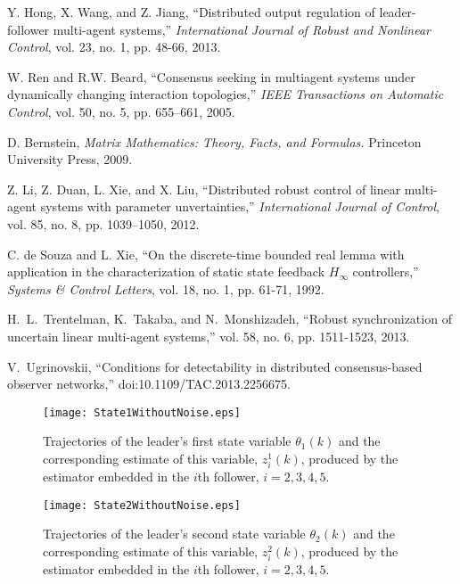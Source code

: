 \documentclass[a4paper,10pt,onecolumn]{article}
\begin{document}
\begin{thebibliography}{99}
Y. Hong, X. Wang, and Z. Jiang, ``Distributed output regulation of leader-follower multi-agent systems,''
\emph{International Journal of Robust and Nonlinear Control}, vol. 23, no. 1, pp. 48-66, 2013.

W. Ren and R.W. Beard, ``Consensus seeking in multiagent systems
under dynamically changing interaction topologies,''
\emph{IEEE Transactions on Automatic Control}, vol. 50, no. 5, pp. 655--661, 2005.

D. Bernstein, \emph{Matrix Mathematics: Theory, Facts, and Formulas.} Princeton University Press, 2009.

Z. Li, Z. Duan, L. Xie, and X. Liu, ``Distributed robust control of linear multi-agent systems with parameter unvertainties,'' \emph{International Journal of Control}, vol. 85, no. 8, pp. 1039--1050, 2012.


C. de Souza and L. Xie, ``On the discrete-time bounded real lemma with application in the characterization
of static state feedback $H_{\infty}$ controllers,''
\emph{Systems \& Control Letters}, vol. 18, no. 1, pp. 61-71, 1992.

H.~L.~Trentelman, K.~Takaba, and N.~Monshizadeh,
\newblock ``Robust synchronization of uncertain linear multi-agent systems,''
 vol. 58, no. 6, pp. 1511-1523, 2013.

V.~Ugrinovskii,
\newblock ``Conditions for detectability in distributed consensus-based
observer networks,''
 doi:10.1109/TAC.2013.2256675.




\end{thebibliography}

\newpage
    \begin{figure}[h]
      \centering
      \texttt{[image: State1WithoutNoise.eps]}
      \caption{Trajectories of the leader's first state variable
        $\theta_{1}(k)$ and the corresponding estimate of this variable,
        $z_{i}^{1}(k)$, produced by the estimator embedded in the $i$th
        follower, $i=2,3,4,5$.}
      \label{figure2}
   \end{figure}


       \begin{figure}[h]
      \centering
      \texttt{[image: State2WithoutNoise.eps]}
      \caption{Trajectories of the leader's second state variable $\theta_{2}(k)$ and the corresponding estimate of this variable,
        $z_{i}^{2}(k)$, produced by the estimator embedded in the $i$th follower, $i=2,3,4,5$.}
      \label{figure3}
   \end{figure}
\end{document}
